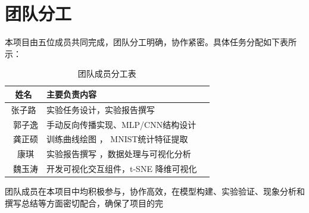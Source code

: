 \section{团队分工}

本项目由五位成员共同完成，团队分工明确，协作紧密。具体任务分配如下表所示：

\begin{table}[H]
  \centering
  \caption{团队成员分工表}
  \begin{tabular}{cll}
    \toprule
    姓名 & 主要负责内容  \\\midrule
    张子路 & 实验任务设计，实验报告撰写 \\\
    郭子逸 & 手动反向传播实现、MLP/CNN结构设计  \\\
    龚正硕 & 训练曲线绘图 ， MNIST统计特征提取 \\\
    康琪 & 实验报告撰写 ，数据处理与可视化分析 \\\
    魏玉涛 & 开发可视化交互组件，t-SNE 降维可视化\\\bottomrule
  \end{tabular}
  \label{tab:team-work}
\end{table}

团队成员在本项目中均积极参与，协作高效，在模型构建、实验验证、现象分析和撰写总结等方面密切配合，确保了项目的完